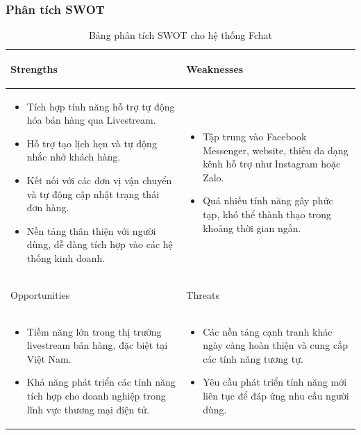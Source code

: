 \subsubsection{Phân tích SWOT}
\begin{table}[H]
\centering
\begin{tabular}{|p{7cm}|p{7cm}|}
\hline
 \begin{center}
     Strengths
 \end{center} & \begin{center}
     Weaknesses
 \end{center}  \\
\hline
\begin{itemize}
    \item Tích hợp tính năng hỗ trợ tự động hóa bán hàng qua Livestream.
    \item Hỗ trợ tạo lịch hẹn và tự động nhắc nhở khách hàng.
    \item Kết nối với các đơn vị vận chuyển và tự động cập nhật trạng thái đơn hàng.
    \item Nền tảng thân thiện với người dùng, dễ dàng tích hợp vào các hệ thống kinh doanh.
\end{itemize} &  
\begin{itemize}
    \item Tập trung vào Facebook Messenger, website, thiếu đa dạng kênh hỗ trợ như Instagram hoặc Zalo.
    \item Quá nhiều tính năng gây phức tạp, khó thể thành thạo trong khoảng thời gian ngắn.
\end{itemize}\\
\hline
\begin{center}
    Opportunities
\end{center} & \begin{center}
    Threats
\end{center}\\
\hline
\begin{itemize}
    \item Tiềm năng lớn trong thị trường livestream bán hàng, đặc biệt tại Việt Nam.
\item Khả năng phát triển các tính năng tích hợp cho doanh nghiệp trong lĩnh vực thương mại điện tử.
\end{itemize} &  
\begin{itemize}
    \item Các nền tảng cạnh tranh khác ngày càng hoàn thiện và cung cấp các tính năng tương tự.
\item Yêu cầu phát triển tính năng mới liên tục để đáp ứng nhu cầu người dùng.
\end{itemize}\\
\hline
\end{tabular}
\caption{Bảng phân tích SWOT cho hệ thống Fchat}
\end{table}

